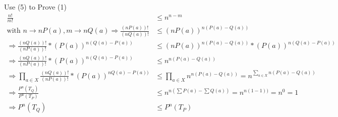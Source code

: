\documentclass[
  course = {{EE623 Information Theory}},
  quartile = {{Fall 2020}},
  assignment = 4,
  name = {{Mohammad Mahdi Rahimi}},
  studentnumber = {{20208244}},
  email = {{mahi@kaist.ac.kr}},
  firstexercise = 1
]{aga-homework}
\begin{document}
\subexercise Use (5) to Prove (1)\\
\begin{equation} \label{eq3}
\begin{split}
\frac{n!}{m!} & \le n^{n - m}\\
\text{with }n \rightarrow nP(a), m \rightarrow nQ(a)  \Rightarrow \frac{(nP(a))!}{(nQ(a))!} & \le (nP(a))^{n(P(a) - Q(a))}\\
\Rightarrow \frac{(nQ(a))!}{(nP(a))!} * (P(a))^{n(Q(a) - P(a))} & \le (nP(a))^{n(P(a) - Q(a))} * (P(a))^{n(Q(a) - P(a))}\\
\Rightarrow \frac{(nQ(a))!}{(nP(a))!} * (P(a))^{n(Q(a) - P(a))} & \le n^{n(P(a) - Q(a))}\\
\Rightarrow \prod_{a \in X}\frac{(nQ(a))!}{(nP(a))!} * (P(a))^{nQ(a) - P(a))} & \le  \prod_{a \in X}n^{n(P(a) - Q(a))} = n^{\sum_{a \in X} n(P(a) - Q(a))}\\
\Rightarrow \frac{P^n(T_Q)}{P^n(T_P)} & \le n^{n(\sum P(a) - \sum Q(a))} = n^{n(1 - 1))} = n^0 = 1 \\
\Rightarrow P^n(T_Q) & \le P^n(T_P)
\end{split}
\end{equation}
\end{document}
